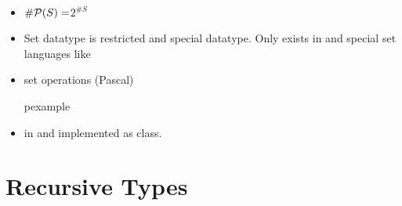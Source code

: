 \begin{frame}
\begin{itemize}
  \item $\#{\cal P}(S) = $\pause $2^{\#S}$
\end{itemize}
\end{frame}
\begin{frame}
\begin{itemize}
  \item Set datatype is restricted and special datatype. Only exists in  and
  special set languages like 
  \item set operations (Pascal)
\begin{beamercolorbox}{pexample}
\codekumeP
\end{beamercolorbox}

  \item in  and  implemented as class.
\end{itemize}

\end{frame}

\section{Recursive Types}
